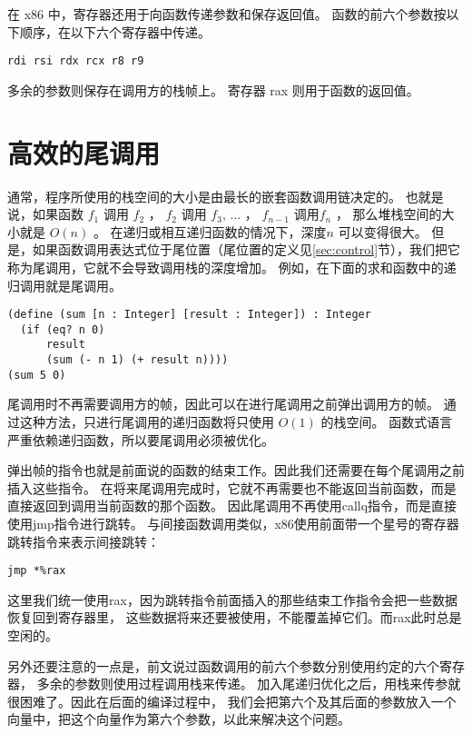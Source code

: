 在 x86 中，寄存器还用于向函数传递参数和保存返回值。
函数的前六个参数按以下顺序，在以下六个寄存器中传递。

\begin{lstlisting}
rdi rsi rdx rcx r8 r9
\end{lstlisting}

多余的参数则保存在调用方的栈帧上。
寄存器 rax 则用于函数的返回值。

\section{高效的尾调用}
\label{sec:tail-call}

通常，程序所使用的栈空间的大小是由最长的嵌套函数调用链决定的。
也就是说，如果函数
$f_1$ 调用 $f_2$ ， $f_2$ 调用 $f_3$, $\ldots$ ， $f_{n-1}$ 调用$f_n$ ，
那么堆栈空间的大小就是 $O(n)$ 。
在递归或相互递归函数的情况下，深度$n$ 可以变得很大。
但是，如果函数调用表达式位于尾位置（尾位置的定义见\ref{sec:control}节），我们把它称为尾调用，它就不会导致调用栈的深度增加。
例如，在下面的求和函数中的递归调用就是尾调用。

\begin{lstlisting}
(define (sum [n : Integer] [result : Integer]) : Integer
  (if (eq? n 0)
      result
      (sum (- n 1) (+ result n))))
(sum 5 0)
\end{lstlisting}

尾调用时不再需要调用方的帧，因此可以在进行尾调用之前弹出调用方的帧。
通过这种方法，只进行尾调用的递归函数将只使用 $O(1)$ 的栈空间。
函数式语言严重依赖递归函数，所以要尾调用必须被优化。

弹出帧的指令也就是前面说的函数的结束工作。因此我们还需要在每个尾调用之前插入这些指令。
在将来尾调用完成时，它就不再需要也不能返回当前函数，而是直接返回到调用当前函数的那个函数。
因此尾调用不再使用callq指令，而是直接使用jmp指令进行跳转。
与间接函数调用类似，x86使用前面带一个星号的寄存器跳转指令来表示间接跳转：
\begin{lstlisting}
jmp *%rax
\end{lstlisting}
这里我们统一使用rax，因为跳转指令前面插入的那些结束工作指令会把一些数据恢复回到寄存器里，
这些数据将来还要被使用，不能覆盖掉它们。而rax此时总是空闲的。

另外还要注意的一点是，前文说过函数调用的前六个参数分别使用约定的六个寄存器，
多余的参数则使用过程调用栈来传递。
加入尾递归优化之后，用栈来传参就很困难了。因此在后面的编译过程中，
我们会把第六个及其后面的参数放入一个向量中，把这个向量作为第六个参数，以此来解决这个问题。
